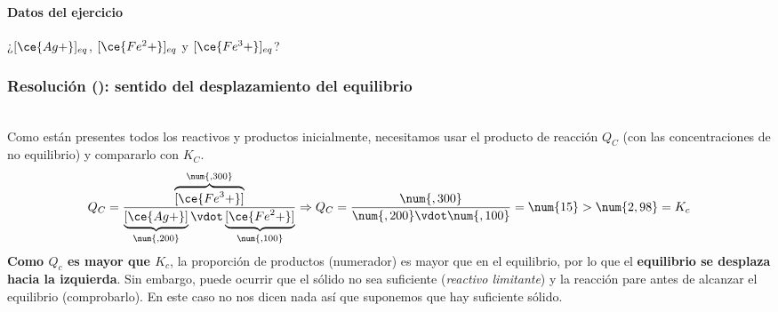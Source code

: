 
\begin{frame}
	\frametitle{\ejerciciocmd}
	\framesubtitle{Datos del ejercicio}
	\begin{center}
		{\LARGE ¿$[\ce{Ag+}]_{eq}$, $[\ce{Fe^2+}]_{eq}$ y $[\ce{Fe^3+}]_{eq}$?}
		\quad{}\quad
		\\[.4cm]
		\quad
		\quad
	\end{center}
\end{frame}

\begin{frame}
	\frametitle{Resolución (): sentido del desplazamiento del equilibrio}
	 \\[.3cm]
	 Como están presentes todos los reactivos y productos inicialmente, necesitamos usar el producto de reacción $Q_C$ (con las concentraciones de no equilibrio) y compararlo con $K_C$.
	$$
		Q_C = \frac{\overbrace{[\ce{Fe^3+}]}^{\num{,300}}}{\underbrace{[\ce{Ag+}]}_{\num{,200}}\vdot\underbrace{[\ce{Fe^2+}]}_{\num{,100}}}\Rightarrow
		Q_C = \frac{\num{,300}}{\num{,200}\vdot\num{,100}} = \num{15} > \num{2,98}=K_c
	$$
	\textbf{Como $Q_c$ es mayor que $K_c$}, la proporción de productos (numerador) es mayor que en el equilibrio, por lo que el \textbf{equilibrio se desplaza hacia la izquierda}. Sin embargo, puede ocurrir que el sólido no sea suficiente (\textit{reactivo limitante}) y la reacción pare antes de alcanzar el equilibrio (comprobarlo). En este caso no nos dicen nada así que suponemos que hay suficiente sólido.
\end{frame}

